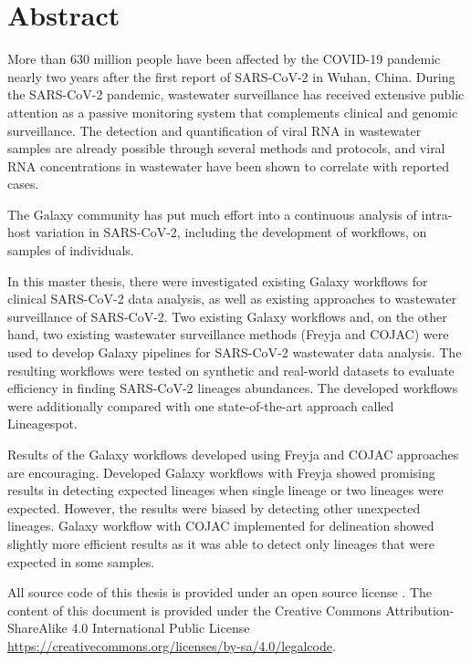 %
\section*{Abstract}

More than 630 million people have been affected by the COVID-19 pandemic nearly two years after the first report of SARS-CoV-2 in Wuhan, China. During the SARS-CoV-2 pandemic, wastewater surveillance has received extensive public attention as a passive monitoring system that complements clinical and genomic surveillance. The detection and quantification of viral RNA in wastewater samples are already possible through several methods and protocols, and viral RNA concentrations in wastewater have been shown to correlate with reported cases.
    
The Galaxy community has put much effort into a continuous analysis of intra-host variation in SARS-CoV-2, including the development of workflows, on samples of individuals.
    
In this master thesis, there were investigated existing Galaxy workflows for clinical SARS-CoV-2 data analysis, as well as existing approaches to wastewater surveillance of SARS-CoV-2. Two existing Galaxy workflows and, on the other hand, two existing wastewater surveillance methods (Freyja and COJAC) were used to develop Galaxy pipelines for SARS-CoV-2 wastewater data analysis. The resulting workflows were tested on synthetic and real-world datasets to evaluate efficiency in finding SARS-CoV-2 lineages abundances. The developed workflows were additionally compared with one state-of-the-art approach called Lineagespot.

Results of the Galaxy workflows developed using Freyja and COJAC approaches are encouraging. Developed Galaxy workflows with Freyja showed promising results in detecting expected lineages when single lineage or two lineages were expected. However, the results were biased by detecting other unexpected lineages. Galaxy workflow with COJAC implemented for delineation showed slightly more efficient results as it was able to detect only lineages that were expected in some samples.

All source code of this thesis is provided under an open source license \cite{ghiuc, ghvisualize}. The content of this document \cite{ghlatex} is provided under the Creative Commons Attribution-ShareAlike 4.0 International Public License \url{https://creativecommons.org/licenses/by-sa/4.0/legalcode}.


